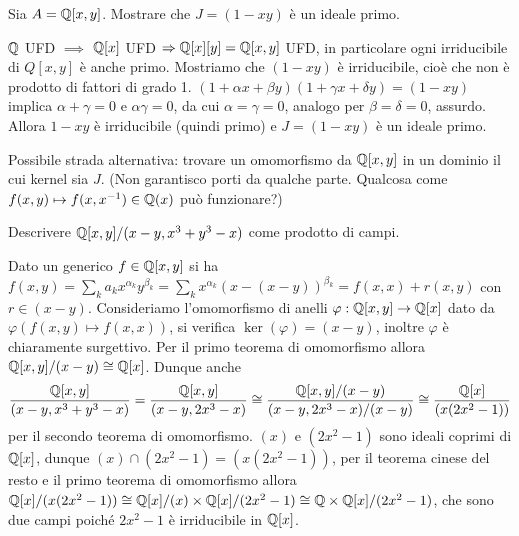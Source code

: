 \begin{exercise}
    Sia $A = \mathbb{Q}[x, y]$. Mostrare che $J = (1 - xy)$ è un ideale primo.
\end{exercise}
\begin{solution}
    $\mathbb{Q}$ UFD $\implies$ $\mathbb{Q}[x]$ UFD $\Rightarrow \mathbb{Q}[x][y] = \mathbb{Q}[x, y]$ UFD, in particolare ogni irriducibile di $Q[x, y]$ è anche primo. Mostriamo che $(1 - xy)$ è irriducibile, cioè che non è prodotto di fattori di grado 1. $(1 + \alpha x + \beta y)(1 + \gamma x + \delta y) = (1 - xy)$ implica $\alpha + \gamma = 0$ e $\alpha \gamma = 0$, da cui $\alpha = \gamma = 0$, analogo per $\beta = \delta = 0$, assurdo. Allora $1 - xy$ è irriducibile (quindi primo) e $J = (1 - xy)$ è un ideale primo.

    Possibile strada alternativa: trovare un omomorfismo da $\mathbb{Q}[x, y]$ in un dominio il cui kernel sia $J$. (Non garantisco porti da qualche parte. Qualcosa come $f(x, y) \mapsto f(x, x^{-1}) \in \mathbb{Q}(x)$ può funzionare?)
\end{solution}

\begin{exercise}
    Descrivere $\mathbb{Q}[x, y]/(x - y, x^3 + y^3 - x)$ come prodotto di campi.
\end{exercise}
\begin{solution}
    Dato un generico $f \in \mathbb{Q}[x, y]$ si ha $f(x, y) = \sum_k a_k x^{\alpha_k}y^{\beta_k} = \sum_k x^{\alpha_k} (x - (x - y))^{\beta_k} = f(x, x) + r(x, y)$ con $r \in (x - y)$. Consideriamo l'omomorfismo di anelli $\varphi : \mathbb{Q}[x, y] \to \mathbb{Q}[x]$ dato da $\varphi(f(x, y) \mapsto f(x, x))$, si verifica $\ker(\varphi) = (x - y)$, inoltre $\varphi$ è chiaramente surgettivo. Per il primo teorema di omomorfismo allora $\mathbb{Q}[x, y]/(x - y) \cong \mathbb{Q}[x]$. Dunque anche
    \[
        \frac{\mathbb{Q}[x, y]}{(x - y, x^3 + y^3 - x)} = \frac{\mathbb{Q}[x, y]}{(x - y, 2x^3 - x)} \cong \frac{\mathbb{Q}[x, y]/(x - y)}{(x - y, 2x^3 - x)/(x - y)} \cong \frac{\mathbb{Q}[x]}{(x(2x^2 - 1))}
    \]
    per il secondo teorema di omomorfismo. $(x)$ e $(2x^2 - 1)$ sono ideali coprimi di $\mathbb{Q}[x]$, dunque $(x) \cap (2x^2 - 1) = (x(2x^2 - 1))$, per il teorema cinese del resto e il primo teorema di omomorfismo allora $\mathbb{Q}[x]/(x(2x^2 - 1)) \cong \mathbb{Q}[x]/(x) \times \mathbb{Q}[x]/(2x^2 - 1) \cong \mathbb{Q} \times \mathbb{Q}[x]/(2x^2 - 1)$, che sono due campi poiché $2x^2 - 1$ è irriducibile in $\mathbb{Q}[x]$.
\end{solution}

